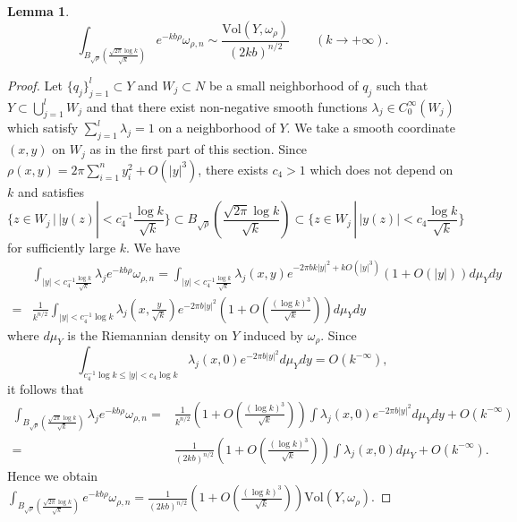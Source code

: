 \documentclass[12pt,oneside]{amsart}
\theoremstyle{plain}
\newtheorem{lemma}{Lemma}
\theoremstyle{definition}
\theoremstyle{remark}
\begin{document}
\begin{lemma}\label{lemma:7}
\[
\int_{B_{\sqrt{\rho}}(\frac{\sqrt{2\pi}\log k}{\sqrt{k}})} e^{-kb\rho} \omega_{\rho, n} \sim \frac{\mathrm{Vol}(Y, \omega_{\rho})}{(2kb)^{n/2}} \qquad (k \to +\infty).  
\]
\end{lemma}
\begin{proof}
Let $\{q_{j}\}_{j = 1}^{l} \subset Y$ and $W_{j} \subset N$ be a small neighborhood of $q_{j}$ such that $Y \subset \bigcup_{j=1}^l W_{j}$ and that there exist 
non-negative smooth functions $\lambda_{j} \in C^{\infty}_{0}(W_{j})$ which satisfy $\sum_{j=1}^{l}\lambda_{j} = 1$ on a neighborhood of $Y$.  
We take a smooth coordinate $(x, y)$ on $W_j$ as in the first part of this section.  
Since $\rho(x, y) = 2\pi \sum_{i=1}^{n} y_{i}^2 + O(|y|^3)$, 
there exists $c_{4} > 1$ which does not depend on $k$ and satisfies 
\[
\{z \in W_j \, |\, |y(z)| < c_{4}^{-1}\frac{\log k}{\sqrt{k}} \} \subset   B_{\sqrt{\rho}}(\frac{\sqrt{2\pi}\log k}{\sqrt{k}}) \subset \{z \in W_j \, |\, |y(z)| < c_{4}\frac{\log k}{\sqrt{k}}\}
\]
for sufficiently large $k$.  
We have 
\begin{align*}
& \int_{|y| < c_{4}^{-1} \frac{\log k}{\sqrt{k}}} \lambda_{j}e^{-kb\rho}\omega_{\rho, n}  = \int_{|y| < c_{4}^{-1} \frac{\log k}{\sqrt{k}}} \lambda_{j}(x, y) e^{-2\pi b k|y|^2 + kO(|y|^3)} (1+ O(|y|)) d\mu_{Y}dy \\
= & \frac{1}{k^{n/2}}\int_{|y| < c_{4}^{-1}\log k} \lambda_{j}(x, \frac{y}{\sqrt{k}}) e^{-2\pi b |y|^2} \left(1 + O\left(\frac{(\log k)^3}{\sqrt{k}}\right) \right) d\mu_{Y}dy
\end{align*}
where $d\mu_{Y}$ is the Riemannian density on $Y$ induced by $\omega_{\rho}$.  
Since 
\[
\int_{c_{4}^{-1} \log k \leq |y| < c_4 \log k}\lambda_{j}(x, 0) e^{-2\pi b |y|^2} d\mu_{Y}dy = O(k^{-\infty}), 
\]
it follows that 
\begin{align*}
\int_{B_{\sqrt{\rho}}(\frac{\sqrt{2\pi} \log k}{\sqrt{k}})} \lambda_{j} e^{-kb\rho}\omega_{\rho, n} 
= &\frac{1}{k^{n/2}} \left(1 + O\left(\frac{(\log k)^3}{\sqrt{k}}\right) \right) \int \lambda_{j}(x, 0) e^{-2\pi b |y|^2} d\mu_{Y} dy + O(k^{-\infty}) \\
= & \frac{1}{(2kb)^{n/2}} \left(1 + O\left(\frac{(\log k)^3}{\sqrt{k}}\right) \right)  \int \lambda_{j}(x, 0) d\mu_{Y} + O(k^{-\infty}).  
\end{align*}
Hence we obtain $\int_{B_{\sqrt{\rho}}(\frac{\sqrt{2\pi} \log k}{\sqrt{k}})} e^{-kb\rho}\omega_{\rho, n} = \frac{1}{(2kb)^{n/2}} \left(1 + O\left(\frac{(\log k)^3}{\sqrt{k}}\right) \right) \mathrm{Vol}(Y, \omega_{\rho})$.  
\end{proof}
\end{document}

